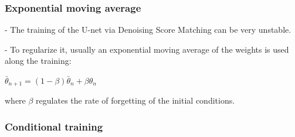 














\subsubsection*{Exponential moving average}
- The training of the U-net via Denoising Score Matching can be very unstable. 

- To regularize it, usually an exponential moving average of the weights is used along the training:

$
\bar{\theta}_{n+1}=(1-\beta) \bar{\theta}_{n}+\beta \theta_{n}
$

where $\beta$ regulates the rate of forgetting of the initial conditions.

\subsubsection*{Conditional training}

